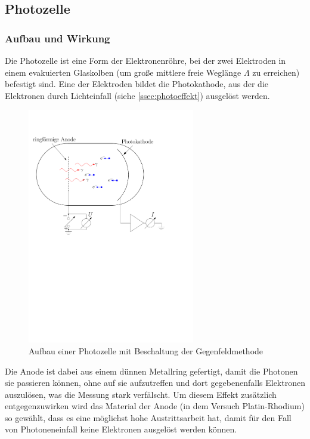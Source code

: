 \documentclass[11pt, a4paper]{article}
\numberwithin{equation}{section}
\begin{document}
\subsection{Photozelle}

\subsubsection{Aufbau und Wirkung}
Die Photozelle ist eine Form der Elektronenröhre, bei der zwei Elektroden in einem evakuierten Glaskolben (um große mittlere freie Weglänge $\Lambda$ zu erreichen) befestigt sind.
Eine der Elektroden bildet die Photokathode, aus der die Elektronen durch Lichteinfall (siehe \ref{ssec:photoeffekt}) ausgelöst werden.
\begin{figure}[h]
\centering
\includegraphics[width=0.65\textwidth]{./figures/aufbau_photozelle.pdf}
\caption{Aufbau einer Photozelle mit Beschaltung der Gegenfeldmethode}
\label{fig:aufbau_photozelle}
\end{figure}
Die Anode ist dabei aus einem dünnen Metallring gefertigt, damit die Photonen sie passieren können, ohne auf sie aufzutreffen und dort gegebenenfalls Elektronen auszulösen, was die Messung stark verfälscht.
Um diesem Effekt zusätzlich entgegenzuwirken wird das Material der Anode (in dem Versuch Platin-Rhodium) so gewählt, dass es eine möglichst hohe Austrittsarbeit hat, damit für den Fall von Photoneneinfall keine Elektronen ausgelöst werden können.
\end{document}

